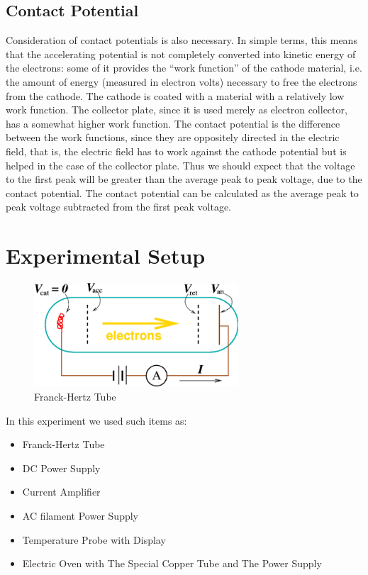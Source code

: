 \documentclass[aps,twocolumn,secnumarabic,nobalancelastpage,amsmath,amssymb,
nofootinbib]{revtex4}
\begin{document}
\subsection{Contact Potential}

Consideration of contact potentials is also necessary. In simple terms, this means that the 
accelerating potential is not completely converted into kinetic energy of the electrons: some of it 
provides the “work function” of the cathode material, i.e. the amount of energy (measured in 
electron volts) necessary to free the electrons from the cathode. The cathode is coated with a 
material with a relatively low work function. The collector plate, since it is used merely as 
electron collector, has a somewhat higher work function. The contact potential is the difference 
between the work functions, since they are oppositely directed in the electric field, that is, the 
electric field has to work against the cathode potential but is helped in the case of the collector 
plate. Thus we should expect that the voltage to the first peak will be greater than the average 
peak to peak voltage, due to the contact potential. The contact potential can be calculated as the 
average peak to peak voltage subtracted from the first peak voltage. 


\section{Experimental Setup}

\begin{figure}[htbp]
\includegraphics[width=3in]{experiment}
\caption{Franck-Hertz Tube}
\label{fig:schematic}
\end{figure}

In this experiment we used such items as:

\begin{itemize}
\item Franck-Hertz Tube
\item DC Power Supply
\item Current Amplifier
\item AC filament Power Supply
\item Temperature Probe with Display
\item Electric Oven with The Special Copper Tube and The Power Supply
\end{itemize}
\end{document}

